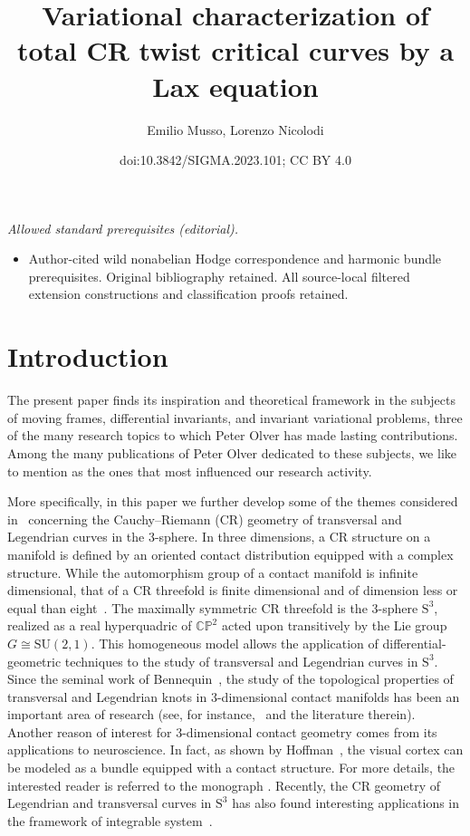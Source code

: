 \documentclass[10pt,a4paper]{amsart}
\title{Variational characterization of total CR twist critical curves by a Lax equation}
\author{Emilio Musso, Lorenzo Nicolodi}
\date{doi:10.3842/SIGMA.2023.101; CC BY 4.0}
\numberwithin{equation}{section}
\begin{document}
\maketitle
\noindent\textit{Allowed standard prerequisites (editorial).}\begin{itemize}
\item Author-cited wild nonabelian Hodge correspondence and harmonic bundle prerequisites. Original bibliography retained. All source-local filtered extension constructions and classification proofs retained.
\end{itemize}\medskip
\section{Introduction}%

The present paper finds its inspiration and theoretical framework in
the subjects of moving frames, differential invariants, and invariant variational problems,
three of the many research topics to which Peter Olver has made
lasting contributions.
%
Among the many publications of
Peter Olver dedicated to these subjects, we like to mention
\cite{FelsOlver1, FelsOlver2,Olver-book1,Olver-book2}
as the ones that most influenced
our research activity.

More specifically, in this paper we further develop some of the themes
considered in~\cite{M,MNS-Kharkiv,MS}
concerning the Cauchy--Riemann (CR) geometry of transversal and Legendrian curves in the 3-sphere.
In three dimensions, a CR structure on a manifold is defined by an oriented contact distribution
equipped with a complex structure.
%
While the automorphism group of a contact manifold is infinite dimensional,
that of a CR threefold is finite dimensional and of dimension less or equal than eight~\cite{Cartan1932-2,Cartan1932,ChMo1974}.
The maximally symmetric CR threefold is the 3-sphere ${\mathrm S}^3$, realized as a real hyperquadric of $\mathbb{CP}^2$
acted upon transitively by the Lie group $G \cong \mathrm{SU}(2,1)$.
This homogeneous model allows the application of
differential-geometric techniques to the study of transversal and Legendrian curves in ${\mathrm S}^3$.
Since the seminal work of Bennequin~\cite{Benn1983}, the study of the topological properties of transversal and Legendrian
knots in 3-dimensional contact manifolds has been an important area of research
(see, for instance,~\cite{Eliash1993,Et3,Etn1999, Et2,EtHo,FuTa1997} and the literature therein).
Another reason of interest for 3-dimensional contact geometry
comes from its applications to neuroscience.
In fact, as shown by Hoffman~\cite{Ho}, the visual cortex can be modeled as a bundle equipped with a contact structure.
For more details, the interested reader is referred to the monograph
\cite[Section~5]{Pe}.
Recently, the CR geometry of Legendrian and transversal curves in ${\mathrm S}^3$ has also found
interesting applications in the framework of integrable system~\cite{CI}.
\end{document}
